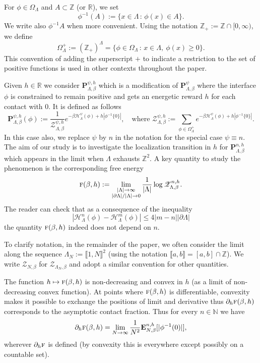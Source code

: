 \documentclass[10pt]{amsart}
\let\mathcal\mathscr
\newcommand{\sep}{\,:\,}
\numberwithin{equation}{section}
\theoremstyle{plain}
\theoremstyle{definition}
\newcommand{\lint}{\llbracket}
\newcommand{\rint}{\rrbracket}
\newcommand{\cH}{{\ensuremath{\mathcal H}} }
\newcommand{\cZ}{{\ensuremath{\mathcal Z}} }
\newcommand{\bP}{{\ensuremath{\mathbf P}} }
\newcommand{\bE}{{\ensuremath{\mathbf E}} }
\newcommand{\limtwo}[2]{\lim_{\substack{#1 \\ #2}}}
\newcommand{\bbN}{{\ensuremath{\mathbb N}} }
\newcommand{\bbR}{{\ensuremath{\mathbb R}} }
\newcommand{\bbZ}{{\ensuremath{\mathbb Z}} }
\newcommand{\gb}{\beta}
\newcommand{\gO}{\Omega}
\newcommand{\gL}{\Lambda}
\newcommand{\tf}{\textsc{f}}
\begin{document}
For $\phi \in \gO_{\gL}$ and $A\subset \bbZ$ (or $\bbR$), we set
\[
\phi^{-1}(A):=\{ x\in \gL \sep \phi(x)\in A\}.
\]
We write also $\phi^{-1}A$ when more convenient.
Using the notation $\bbZ_+:=\bbZ\cap[0,\infty)$, we define
\begin{equation}\label{positivity}
\gO^+_{\gL}:=(\bbZ_+)^{\gL}=\{\phi \in \gO_{\gL} \sep x\in \gL,\ \phi(x)\ge 0\}.
\end{equation}
This convention of adding the superscript $+$ to indicate a restriction to the set of positive functions
is used in other contexts throughout the paper.

Given $h\in \bbR$ we consider $\bP^{\psi,h}_{\gL,\gb}$ which is a modification of $\bP^{\psi}_{\gL,\gb}$
where the interface $\phi$ is constrained to remain positive
and gets an energetic reward $h$ for each contact with $0$.
It is defined as follows
\begin{equation*}%
\bP^{\psi,h}_{\gL,\gb}(\phi):= \frac{1}{\mathcal Z^{\psi,h}_{\gL,\gb}}e^{-\gb\cH^\psi_\gL(\phi)+ h|\phi^{-1}\{0\}|},
\quad \text{where } \mathcal Z^{\psi,h}_{\gL,\gb}:=\sum_{\phi\in \gO^+_{\gL}} e^{-\gb\cH^\psi_\gL(\phi)+h|\phi^{-1}\{0\}|}.
\end{equation*}
In this case also, we replace $\psi$ by $n$ in the notation for the special case $\psi\equiv n$.
The aim of our study is to investigate the localization transition in $h$ for $\bP^{n,h}_{\gL,\gb}$ which appears in the limit when $\gL$ exhausts $\bbZ^2$.
A key quantity to study the phenomenon is the corresponding free energy
\begin{equation*}%
\tf(\gb,h):=\limtwo{|\gL|\to \infty}{|\partial \gL|/|\gL|\to 0} \frac{1}{|\gL|}\log \mathcal Z^{n,h}_{\gL,\gb}.
\end{equation*}
The reader can check that as a consequence of the inequality
\[
|\cH^n_\gL(\phi)- \cH^m_\gL(\phi)|\le 4 |m-n| |\partial \gL|
\]
the quantity
$\tf(\gb,h)$ indeed does not depend on $n$.

To clarify notation, in the remainder of the paper, we often consider the limit along the sequence
$\gL_N:=\lint 1, N\rint^2$ (using the notation $\lint a,b \rint=[a,b]\cap \bbZ$).
We write $\cZ_{N,\gb}$ for $\cZ_{\gL_N,\gb}$ and adopt a similar convention for other quantities.

The function $h\mapsto \tf(\gb,h)$ is non-decreasing and convex in $h$ (as a limit of non-decreasing convex function).
At points where $\tf(\gb,h)$ is differentiable, convexity makes it possible to exchange the positions of limit and derivative
thus $\partial_h \tf(\gb,h)$ corresponds to the
asymptotic contact fraction. Thus for every $n\in \bbN$ we have
\begin{equation}\label{difencial}
\partial_h \tf(\gb,h)=\lim_{N\to \infty} \frac{1}{N^2} \bE^{n,h}_{N,\gb}[|\phi^{-1}(0)|],
\end{equation}
wherever $\partial_h\tf$ is defined (by convexity this is everywhere except possibly on a countable set).
\end{document}

